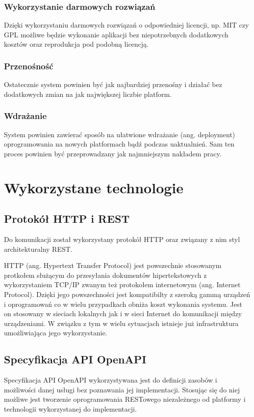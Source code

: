 \documentclass[12pt,a4paper]{article}
\begin{document}
\subsubsection*{Wykorzystanie darmowych rozwiązań}
Dzięki wykorzystaniu darmowych rozwiązań o odpowiedniej licencji, np. MIT czy GPL możliwe
będzie wykonanie aplikacji bez niepotrzebnych dodatkowych kosztów oraz reprodukcja pod
podobną licencją.

\subsubsection*{Przenośność}
Ostatecznie system powinien być jak najbardziej przenośny i działać bez dodatkowych zmian
na jak największej liczbie platform.

\subsubsection*{Wdrażanie}
System powinien zawierać sposób na ułatwione wdrażanie (ang. deployment) oprogramowania
na nowych platformach bądź podczas uaktualnień. Sam ten proces powinien być przeprowadzany
jak najmniejszym nakładem pracy.


\section{Wykorzystane technologie}
\subsection{Protokół HTTP i REST}
Do komunikacji został wykorzystany protokół HTTP oraz związany z nim styl architekturalny
REST.

HTTP (ang. Hypertext Transfer Protocol) jest powszechnie stosowanym protkołem służącym
do przesyłania dokumentów hipertekstowych z wykorzystaniem TCP/IP zwanym też protokołem
internetowym (ang. Internet Protocol). Dzięki jego powszechności jest kompatibilty z szeroką
gammą urządzeń i oprogramowań co w wielu przypadkach obniża koszt wykonania systemu. Jest
on stosowany w sieciach lokalnych jak i w sieci Internet do komunikacji między urządzeniami.
W związku z tym w wielu sytuacjach istnieje już infrastruktura umożliwiająca jego wykorzystanie.

\subsection{Specyfikacja API OpenAPI}
Specyfikacja API OpenAPI wykorzystywana jest do definicji zasobów i możliwości
danej usługi bez poznawania jej implementacji. Stosując się do niej możliwe jest
tworzenie oprogramowania RESTowego niezależnego od platformy i technologii wykorzystanej
do implementacji.
\end{document}
